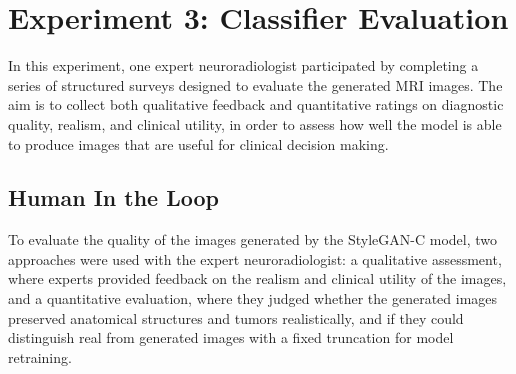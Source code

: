 \clearpage
\section{Experiment 3: Classifier Evaluation}

In this experiment, one expert neuroradiologist participated by completing a series of structured surveys designed to evaluate the generated MRI images. The aim is to collect both qualitative feedback and quantitative ratings on diagnostic quality, realism, and clinical utility, in order to assess how well the model is able to produce images that are useful for clinical decision making.



\subsection{Human In the Loop}

To evaluate the quality of the images generated by the StyleGAN-C model, two approaches were used with the expert neuroradiologist: a qualitative assessment, where experts provided feedback on the realism and clinical utility of the images, and a quantitative evaluation, where they judged whether the generated images preserved anatomical structures and tumors realistically, and if they could distinguish real from generated images with a fixed truncation for model retraining.



